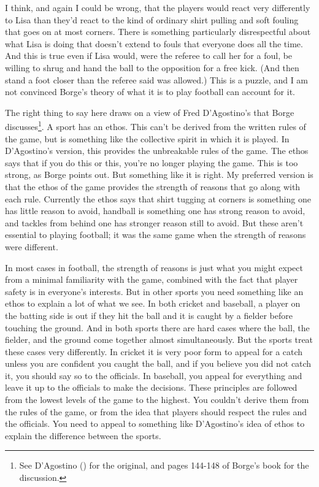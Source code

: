 \documentclass[
  11pt,
  letterpaper,
  DIV=11,
  numbers=noendperiod,
  twoside]{scrartcl}
\begin{document}
I think, and again I could be wrong, that the players would react very
differently to Lisa than they'd react to the kind of ordinary shirt
pulling and soft fouling that goes on at most corners. There is
something particularly disrespectful about what Lisa is doing that
doesn't extend to fouls that everyone does all the time. And this is
true even if Lisa would, were the referee to call her for a foul, be
willing to shrug and hand the ball to the opposition for a free kick.
(And then stand a foot closer than the referee said was allowed.) This
is a puzzle, and I am not convinced Borge's theory of what it is to play
football can account for it.

The right thing to say here draws on a view of Fred D'Agostino's that
Borge discusses\footnote{See D'Agostino
  () for the original, and pages
  144-148 of Borge's book for the discussion.}. A sport has an ethos.
This can't be derived from the written rules of the game, but is
something like the collective spirit in which it is played. In
D'Agostino's version, this provides the unbreakable rules of the game.
The ethos says that if you do this or this, you're no longer playing the
game. This is too strong, as Borge points out. But something like it is
right. My preferred version is that the ethos of the game provides the
strength of reasons that go along with each rule. Currently the ethos
says that shirt tugging at corners is something one has little reason to
avoid, handball is something one has strong reason to avoid, and tackles
from behind one has stronger reason still to avoid. But these aren't
essential to playing football; it was the same game when the strength of
reasons were different.

In most cases in football, the strength of reasons is just what you
might expect from a minimal familiarity with the game, combined with the
fact that player safety is in everyone's interests. But in other sports
you need something like an ethos to explain a lot of what we see. In
both cricket and baseball, a player on the batting side is out if they
hit the ball and it is caught by a fielder before touching the ground.
And in both sports there are hard cases where the ball, the fielder, and
the ground come together almost simultaneously. But the sports treat
these cases very differently. In cricket it is very poor form to appeal
for a catch unless you are confident you caught the ball, and if you
believe you did not catch it, you should say so to the officials. In
baseball, you appeal for everything and leave it up to the officials to
make the decisions. These principles are followed from the lowest levels
of the game to the highest. You couldn't derive them from the rules of
the game, or from the idea that players should respect the rules and the
officials. You need to appeal to something like D'Agostino's idea of
ethos to explain the difference between the sports.
\end{document}
